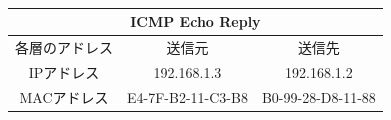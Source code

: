 \documentclass[10pt]{article}
\begin{document}
        \vspace{1.5cm}\\
        
        \begingroup
            \setlength{\tabcolsep}{5pt} %
            \renewcommand{\arraystretch}{1.5} %
            \begin{table}[H]
            \centering
        	\begin{tabular}{|c|c|c|}
        	    \hline
        	   \multicolumn{3}{|c|}{ICMP Echo Reply} \\ \hline
        		\hline\hline
            	   各層のアドレス & 送信元 & 送信先 \\ \hline
            	   IPアドレス & 192.168.1.3 & 192.168.1.2 \\ \hline
            	   MACアドレス & E4-7F-B2-11-C3-B8 &  B0-99-28-D8-11-88\\ \hline
            
        	\end{tabular}
        \end{table} 
        \endgroup
\end{document}

